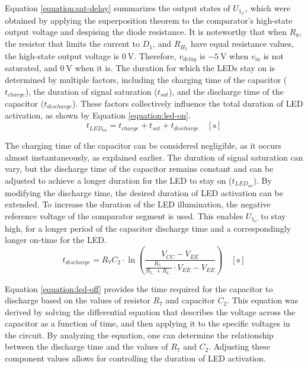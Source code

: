\noindent
Equation \ref{equation:sat-delay} summarizes the output states of $U_{1_C}$, which were obtained by applying the superposition theorem to the comparator's high-state output voltage and despising the diode resistance. It is noteworthy that when $R_8$, the resistor that limits the current to $D_1$, and $R_{H_2}$ have equal resistance values, the high-state output voltage is $\mathrm{0~V}$. Therefore, $v_{delay}$ is $\mathrm{-5~V}$ when $v_{ia}$ is not saturated, and $\mathrm{0~V}$ when it is. The duration for which the \ac{LED}s stay on is determined by multiple factors, including the charging time of the capacitor ($t_{charge}$), the duration of signal saturation ($t_{sat}$), and the discharge time of the capacitor ($t_{discharge}$). These factors collectively influence the total duration of \ac{LED} activation, as shown by Equation \ref{equation:led-on}.
\begin{equation}
    t_{LED_{on}} = t_{charge} + t_{sat} + t_{discharge} \quad [\mathrm{s}]
    \label{equation:led-on}
\end{equation}

The charging time of the capacitor can be considered negligible, as it occurs almost instantaneously, as explained earlier. The duration of signal saturation can vary, but the discharge time of the capacitor remains constant and can be adjusted to achieve a longer duration for the \ac{LED} to stay on ($t_{LED_{on}}$). By modifying the discharge time, the desired duration of \ac{LED} activation can be extended. To increase the duration of the \ac{LED} illumination, the negative reference voltage of the comparator segment is used. This enables $U_{1_C}$ to stay high, for a longer period of the capacitor discharge time and a correspondingly longer on-time for the \ac{LED}.
\begin{equation}
    t_{discharge} = R_7C_2 \cdot\ln {\left(\frac{V_{CC} - V_{EE}}{\frac{R_{5_-}}{R_{5_-}+R_{6_-}} \cdot V_{EE} - {V_{EE}}}\right)} \quad [\mathrm{s}]
    \label{equation:led-off}
\end{equation}

\noindent
Equation \ref{equation:led-off} provides the time required for the capacitor to discharge based on the values of resistor $R_7$ and capacitor $C_2$. This equation was derived by solving the differential equation that describes the voltage across the capacitor as a function of time, and then applying it to the specific voltages in the circuit. By analyzing the equation, one can determine the relationship between the discharge time and the values of $R_7$ and $C_2$. Adjusting these component values allows for controlling the duration of \ac{LED} activation.

